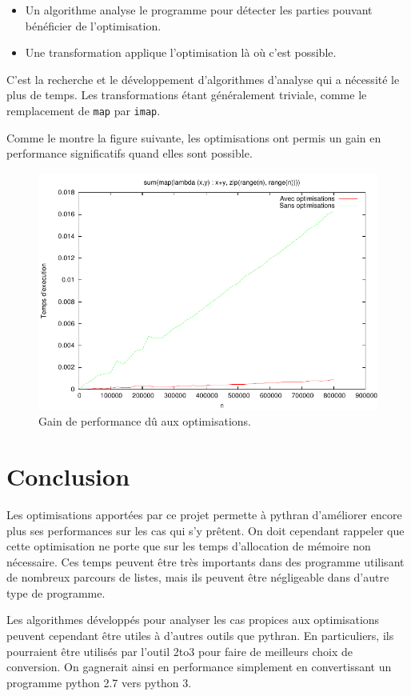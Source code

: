 \documentclass[a4paper]{article}
\begin{document}
\begin{itemize}
\item Un algorithme analyse le programme pour détecter les parties
  pouvant bénéficier de l'optimisation.
\item Une transformation applique l'optimisation là où c'est possible.
\end{itemize}

C'est la recherche et le développement d'algorithmes d'analyse qui a
nécessité le plus de temps. Les transformations étant généralement
triviale, comme le remplacement de \texttt{map} par \texttt{imap}.

Comme le montre la figure suivante, les optimisations ont permis un
gain en performance significatifs quand elles sont possible.

\begin{figure}[h]
  \includegraphics[width=\textwidth]{perf_optimization}
  \caption{Gain de performance dû aux optimisations.}
\end{figure}


\section*{Conclusion}

Les optimisations apportées par ce projet permette à pythran
d'améliorer encore plus ses performances sur les cas qui s'y
prêtent. On doit cependant rappeler que cette optimisation ne porte
que sur les temps d'allocation de mémoire non nécessaire. Ces temps
peuvent être très importants dans des programme utilisant de nombreux
parcours de listes, mais ils peuvent être négligeable dans d'autre
type de programme.

Les algorithmes développés pour analyser les cas propices aux
optimisations peuvent cependant être utiles à d'autres outils que
pythran. En particuliers, ils pourraient être utilisés par l'outil
2to3 pour faire de meilleurs choix de conversion. On gagnerait ainsi
en performance simplement en convertissant un programme python 2.7
vers python 3.
\end{document}
